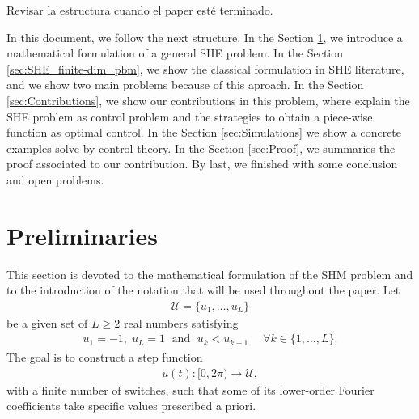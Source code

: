 \documentclass[twocolumn]{autart}    %
\begin{document}
{\color{red} Revisar la estructura cuando el paper est\'e terminado.

In this document, we follow the next structure. In the Section \ref{sec:math_formulation}, we introduce a mathematical formulation of a general SHE problem. 
%
In the Section \ref{sec:SHE_finite-dim_pbm}, we show the classical formulation in SHE literature, and we show two main problems because of this aproach. 
%
In the Section \ref{sec:Contributions}, we show our contributions in this problem, where explain the SHE problem as control problem and the strategies to obtain a piece-wise function as optimal control. 
%
In the Section \ref{sec:Simulations} we show a concrete examples solve by control theory. 
%
In the Section \ref{sec:Proof}, we summaries the proof associated to our contribution. 
%
By last, we finished with some conclusion and open problems. 
}

\section{Preliminaries}\label{sec:math_formulation}

This section is devoted to the mathematical formulation of the SHM problem and to the introduction of the notation that will be used throughout the paper. Let 
\begin{align}\label{eq:Udef}
	\mathcal{U} = \{u_1, \ldots, u_L\}
\end{align}
be a given set of $L\geq 2$ real numbers satisfying
\begin{align*}
	u_1 = -1, \; u_L = 1 \;\text{ and } \; u_k<u_{k+1} \quad\; \forall k\in \{1,\ldots, L\}.
\end{align*}
The goal is to construct a step function
\begin{align*}
	u(t):[0,2\pi)\to\mathcal U,
\end{align*}
with a finite number of switches, such that some of its lower-order Fourier coefficients take specific values prescribed a priori.
\end{document}
